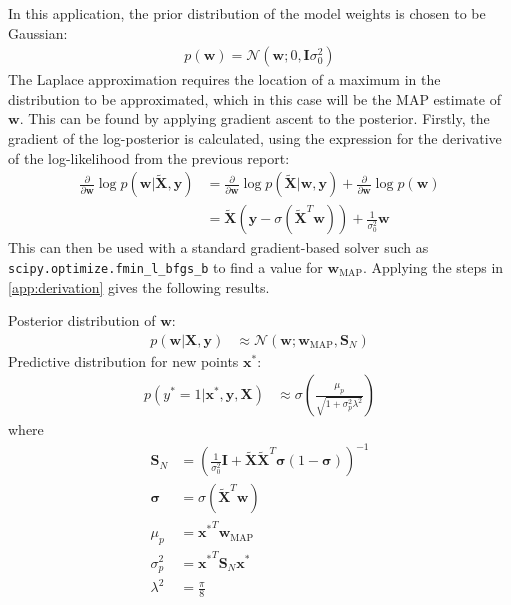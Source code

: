 \documentclass[a4paper]{article}
\begin{document}
    In this application, the prior distribution of the model weights is chosen to be Gaussian:
    \begin{align}
        p(\bm{w}) = \mathcal{N}(\bm{w}; 0, \bm{I}\sigma_0^2)
    \end{align}
    The Laplace approximation requires the location of a maximum in the distribution to be approximated, which in this case will be the MAP estimate of $\bm{w}$.
    This can be found by applying gradient ascent to the posterior.
    Firstly, the gradient of the log-posterior is calculated, using the expression for the derivative of the log-likelihood from the previous report:
    \begin{align}
        \frac{\partial}{\partial \bm{w}} \log p(\bm{w} | \tilde{\bm{X}}, \bm{y}) &= \frac{\partial}{\partial \bm{w}} \log p(\tilde{\bm{X}} | \bm{w} , \bm{y}) + \frac{\partial}{\partial \bm{w}} \log p(\bm{w}) \nonumber \\
        &= \tilde{\bm{X}} (\textbf{y} - \sigma(\tilde{\bm{X}}^T \bm{w})) + \frac{1}{\sigma_0^2} \bm{w}
    \end{align}
    This can then be used with a standard gradient-based solver such as \verb`scipy.optimize.fmin_l_bfgs_b` to find a value for $\bm{w}_\text{MAP}$.
    Applying the steps in \autoref{app:derivation} gives the following results.

    \noindent
    Posterior distribution of $\bm{w}$:
    \begin{align}
        p(\bm{w} | \bm{X}, \bm{y}) &\approx \mathcal{N}(\bm{w}; \bm{w}_\text{MAP}, \bm{S}_N)
    \end{align}
    \noindent
    Predictive distribution for new points $\bm{x}^*$:
    \begin{align}
        p(y^* = 1 | \bm{x}^*, \bm{y}, \bm{X}) &\approx \sigma\left(\frac{\mu_p}{\sqrt{1 + \sigma_p^2\lambda^2}}\right)
    \end{align}
    where
    \begin{align}
        \bm{S}_N &= \left(\frac{1}{\sigma_0^2}\bm{I} + \tilde{\bm{X}}\tilde{\bm{X}}^T \bm{\sigma} (1 - \bm{\sigma})\right)^{-1} \\
        \bm{\sigma} &= \sigma(\tilde{\bm{X}}^T \bm{w}) \\
        \mu_p &= {\bm{x}^*}^T \bm{w}_\text{MAP} \\
        \sigma_p^2 &= {\bm{x}^*}^T \bm{S}_N \bm{x^*} \\
        \lambda^2 &= \frac{\pi}{8}
    \end{align}
\end{document}
